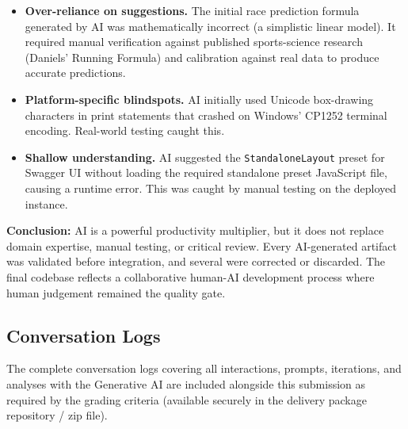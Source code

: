 \documentclass[10pt,a4paper]{article}
\begin{document}
\begin{itemize}[leftmargin=1.5em]
  \item \textbf{Over-reliance on suggestions.} The initial race prediction formula generated by AI was mathematically incorrect (a simplistic linear model). It required manual verification against published sports-science research (Daniels' Running Formula) and calibration against real data to produce accurate predictions.
  \item \textbf{Platform-specific blindspots.} AI initially used Unicode box-drawing characters in print statements that crashed on Windows' CP1252 terminal encoding. Real-world testing caught this.
  \item \textbf{Shallow understanding.} AI suggested the \texttt{StandaloneLayout} preset for Swagger UI without loading the required standalone preset JavaScript file, causing a runtime error. This was caught by manual testing on the deployed instance.
\end{itemize}

\textbf{Conclusion:} AI is a powerful productivity multiplier, but it does not replace domain expertise, manual testing, or critical review. Every AI-generated artifact was validated before integration, and several were corrected or discarded. The final codebase reflects a collaborative human-AI development process where human judgement remained the quality gate.

\subsection{Conversation Logs}
The complete conversation logs covering all interactions, prompts, iterations, and analyses with the Generative AI are included alongside this submission as required by the grading criteria (available securely in the delivery package repository / zip file).
\end{document}
